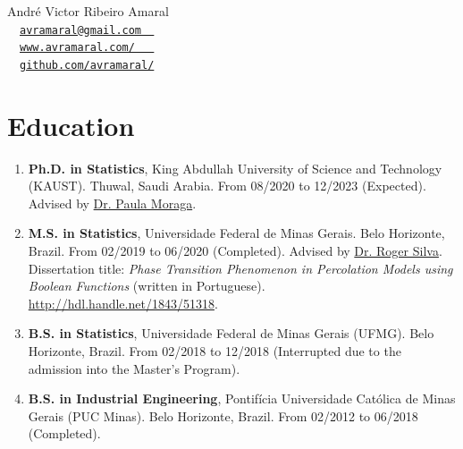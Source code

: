 \documentclass[10pt, ]{article}
\begin{document}
	
	\begin{center}
		{\LARGE André Victor Ribeiro Amaral} \\ \vspace{3pt}
		{\small\faEnvelope~~\href{mailto:avramaral@gmail.com}{\texttt{avramaral@gmail.com~~}}} \\
		{\small\faDesktop~~\href{https://www.avramaral.com/}{\texttt{www.avramaral.com/~~~}}}	\\
		{\small\faGithubAlt~~\href{https://github.com/avramaral/}{\texttt{github.com/avramaral/}}}	
	\end{center}
	
	\vspace{-7pt}
	
	
	\vspace{-12pt}
	\section*{Education} \vspace{-5pt}
	
	\begin{enumerate}[noitemsep, topsep=0pt]
		\item \textbf{Ph.D. in Statistics}, King Abdullah University of Science and Technology (KAUST). Thuwal, Saudi Arabia. From 08/2020 to 12/2023 (Expected). Advised by \href{https://www.paulamoraga.com/}{Dr. Paula Moraga}. %
		
		\item \textbf{M.S. in Statistics}, Universidade Federal de Minas Gerais. Belo Horizonte, Brazil. From 02/2019 to 06/2020 (Completed). Advised by \href{http://www.est.ufmg.br/~rogerwcs/}{Dr. Roger Silva}. %
		\\
		Dissertation title: \textit{Phase Transition Phenomenon in Percolation Models using Boolean Functions} (written in Portuguese). \href{http://hdl.handle.net/1843/51318}{\url{http://hdl.handle.net/1843/51318}}.
		
		\item \textbf{B.S. in Statistics}, Universidade Federal de Minas Gerais (UFMG). Belo Horizonte, Brazil. From 02/2018 to 12/2018 (Interrupted due to the admission into the Master's Program).
		
		\item \textbf{B.S. in Industrial Engineering}, Pontifícia Universidade Católica de Minas Gerais (PUC Minas). Belo Horizonte, Brazil. From 02/2012 to 06/2018 \hspace{-1pt}(Completed). %
		
	\end{enumerate}
	
\end{document}
